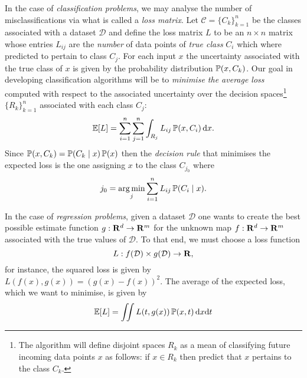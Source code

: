 In the case of \emph{classification problems}, we may analyse the number of
misclassifications via what is called a \emph{loss matrix}. Let
\(\mathcal{C} = \{C_k\}_{k=1}^n\) be the classes associated with a dataset
\(\mathcal{D}\) and define the loss matrix \(L\) to be an \(n \times n\) matrix
whose entries \(L_{i j}\) are the \emph{number} of data points of \emph{true
  class} \(C_i\) which where predicted to pertain to class \(C_j\). For each
input \(x\) the uncertainty associated with the true class of \(x\) is given by
the probability distribution \(\operatorname{\mathbb{P}}(x, C_k)\). Our goal in developing
classification algorithms will be to \emph{minimise the average loss} computed
with respect to the associated uncertainty over the decision spaces\footnote{The
algorithm will define disjoint spaces \(R_k\) as a mean of classifying future
incoming data points \(x\) as follows: if \(x \in R_k\) then predict that \(x\)
pertains to the class \(C_k\).}
\(\{R_k\}_{k=1}^n\) associated with each class \(C_j\):
\[
\operatorname{\mathbb{E}}[L] = \sum_{i=1}^n \sum_{j=1}^n \int_{R_j} L_{i j} \operatorname{\mathbb{P}}(x, C_i)\, \mathrm{d} x.
\]
Since \(\operatorname{\mathbb{P}}(x, C_k) = \operatorname{\mathbb{P}}(C_k \mid x) \operatorname{\mathbb{P}}(x)\) then the \emph{decision
  rule} that minimises the expected loss is the one assigning \(x\) to the class
\(C_{j_0}\) where
\[
j_0 = \operatorname*{arg\,min}_j \sum_{i=1}^n L_{i j} \operatorname{\mathbb{P}}(C_i \mid x).
\]

In the case of \emph{regression problems}, given a dataset \(\mathcal{D}\) one
wants to create the best possible estimate function \(g: \mathbf{R}^d \to \mathbf{R}^m\) for the
unknown map \(f: \mathbf{R}^d \to \mathbf{R}^m\) associated with the true values of
\(\mathcal{D}\). To that end, we must choose a loss function
\[
L: f(\mathcal{D}) \times g(\mathcal{D}) \to \mathbf{R},
\]
for instance, the squared loss is given by \(L(f(x), g(x)) = (g(x) -
f(x))^2\). The average of the expected loss, which we want to minimise, is given
by
\[
\operatorname{\mathbb{E}}[L] = \iint L(t, g(x)) \operatorname{\mathbb{P}}(x, t)\, \mathrm{d} x \mathrm{d} t
\]




